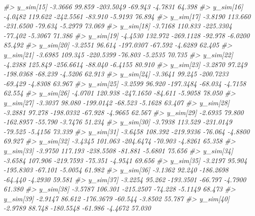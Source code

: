 \documentclass[
  10pt,
  italian,
  a4paper,
  extrafontsizes,onecolumn,openright
  ]{memoir}
\newenvironment{Shaded}{\begin{snugshade}}{\end{snugshade}}
\newcommand{\CommentTok}[1]{\textcolor[rgb]{0.56,0.35,0.01}{\textit{#1}}}
\begin{document}
\begin{Shaded}
\begin{Highlighting}[]
\CommentTok{\#\textgreater{}   y\_sim[15]  {-}3.3666  99.859 {-}203.5049 {-}69.943 {-}4.7831 64.398}
\CommentTok{\#\textgreater{}   y\_sim[16]  {-}4.0482 119.622 {-}242.5561 {-}83.910 {-}5.9193 76.894}
\CommentTok{\#\textgreater{}   y\_sim[17]  {-}3.8190 113.660 {-}231.6500 {-}79.634 {-}5.2979 73.069}
\CommentTok{\#\textgreater{}   y\_sim[18]  {-}3.7168 110.833 {-}225.3304 {-}77.402 {-}5.3067 71.386}
\CommentTok{\#\textgreater{}   y\_sim[19]  {-}4.4530 132.972 {-}269.1128 {-}92.978 {-}6.0200 85.492}
\CommentTok{\#\textgreater{}   y\_sim[20]  {-}3.2551  96.614 {-}197.0307 {-}67.592 {-}4.6289 62.405}
\CommentTok{\#\textgreater{}   y\_sim[21]  {-}3.6985 109.345 {-}220.5399 {-}76.803 {-}5.2535 70.735}
\CommentTok{\#\textgreater{}   y\_sim[22]  {-}4.2388 125.849 {-}256.6614 {-}88.040 {-}6.4155 80.910}
\CommentTok{\#\textgreater{}   y\_sim[23]  {-}3.2870  97.249 {-}198.0368 {-}68.239 {-}4.5206 62.913}
\CommentTok{\#\textgreater{}   y\_sim[24]  {-}3.3641  99.245 {-}200.7233 {-}69.429 {-}4.8308 63.967}
\CommentTok{\#\textgreater{}   y\_sim[25]  {-}3.2599  96.920 {-}197.3484 {-}68.034 {-}4.7158 62.554}
\CommentTok{\#\textgreater{}   y\_sim[26]  {-}4.0701 120.938 {-}247.1650 {-}84.611 {-}5.9058 78.050}
\CommentTok{\#\textgreater{}   y\_sim[27]  {-}3.3037  98.080 {-}199.0142 {-}68.523 {-}5.1628 63.407}
\CommentTok{\#\textgreater{}   y\_sim[28]  {-}3.2881  97.278 {-}198.0332 {-}67.928 {-}4.9665 62.567}
\CommentTok{\#\textgreater{}   y\_sim[29]  {-}2.6935  79.800 {-}162.8957 {-}55.790 {-}3.7476 51.234}
\CommentTok{\#\textgreater{}   y\_sim[30]  {-}3.7938 113.529 {-}231.0149 {-}79.525 {-}5.4156 73.339}
\CommentTok{\#\textgreater{}   y\_sim[31]  {-}3.6458 108.392 {-}219.9336 {-}76.064 {-}4.8800 69.927}
\CommentTok{\#\textgreater{}   y\_sim[32]  {-}3.4345 101.063 {-}204.6474 {-}70.903 {-}4.8261 65.358}
\CommentTok{\#\textgreater{}   y\_sim[33]  {-}3.9750 117.193 {-}238.5508 {-}81.881 {-}5.6801 75.656}
\CommentTok{\#\textgreater{}   y\_sim[34]  {-}3.6584 107.906 {-}219.7593 {-}75.351 {-}4.9541 69.656}
\CommentTok{\#\textgreater{}   y\_sim[35]  {-}3.2197  95.904 {-}195.8303 {-}67.101 {-}5.0054 61.982}
\CommentTok{\#\textgreater{}   y\_sim[36]  {-}3.1362  92.240 {-}186.2698 {-}64.440 {-}4.2930 59.581}
\CommentTok{\#\textgreater{}   y\_sim[37]  {-}3.2254  95.262 {-}193.3501 {-}66.797 {-}4.7900 61.380}
\CommentTok{\#\textgreater{}   y\_sim[38]  {-}3.5787 106.301 {-}215.2507 {-}74.228 {-}5.1149 68.473}
\CommentTok{\#\textgreater{}   y\_sim[39]  {-}2.9147  86.612 {-}176.3679 {-}60.544 {-}3.8502 55.787}
\CommentTok{\#\textgreater{}   y\_sim[40]  {-}2.9789  88.748 {-}180.5548 {-}61.986 {-}4.4672 57.030}

\end{Highlighting}
\end{Shaded}
\end{document}
